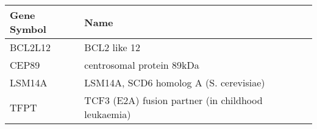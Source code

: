 \begin{tabular}{ll}
\toprule
Gene Symbol &                                               Name \\
\midrule
    BCL2L12 &                                       BCL2 like 12 \\
      CEP89 &                          centrosomal protein 89kDa \\
     LSM14A &             LSM14A, SCD6 homolog A (S. cerevisiae) \\
       TFPT & TCF3 (E2A) fusion partner (in childhood leukaemia) \\
\bottomrule
\end{tabular}
